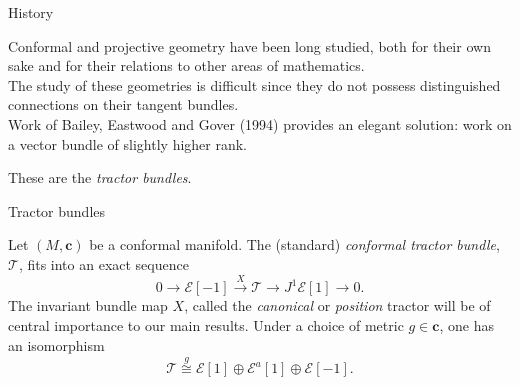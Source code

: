 \documentclass[handout]{beamer}
\begin{document}
\begin{frame}{History}

Conformal and projective geometry have been long studied, both for their own sake and for their relations to other areas of mathematics.
\vspace{1em}\\
\pause
The study of these geometries is difficult since they do not possess distinguished connections on their tangent bundles.
\vspace{1em}\\
\pause
Work of Bailey, Eastwood and Gover (1994) provides an elegant solution: work on a vector bundle of slightly higher rank. 

These are the \emph{tractor bundles}.

\end{frame}

\begin{frame}{Tractor bundles}
  \begin{definition}
    Let \( (M, \bm{c}) \) be a conformal manifold.
    The (standard) \emph{conformal tractor bundle}, \( \mathcal{T} \), fits into an exact sequence
    \pause
    \[
      0 \to \mathcal{E}[-1] \overset{X}{\to} \mathcal{T} \to J^1 \mathcal{E}[1] \to 0.
    \]
    \pause
    The invariant bundle map \( X \), called the \emph{canonical} or \emph{position} tractor will be of central importance to our main results.
    Under a choice of metric \( g \in \bm{c} \), one has an isomorphism 
    \[
      \mathcal{T} \overset{g}{\cong} \mathcal{E}[1] \oplus \mathcal{E}^a [1] \oplus \mathcal{E}[-1].
    \]
  \end{definition}

\end{frame}
\end{document}
